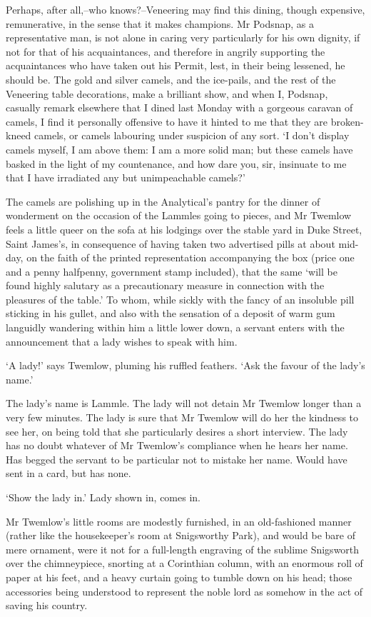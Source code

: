 Perhaps, after all,--who knows?--Veneering may find this dining, though
expensive, remunerative, in the sense that it makes champions.
Mr Podsnap, as a representative man, is not alone in caring very
particularly for his own dignity, if not for that of his acquaintances,
and therefore in angrily supporting the acquaintances who have taken out
his Permit, lest, in their being lessened, he should be. The gold and
silver camels, and the ice-pails, and the rest of the Veneering table
decorations, make a brilliant show, and when I, Podsnap, casually remark
elsewhere that I dined last Monday with a gorgeous caravan of camels,
I find it personally offensive to have it hinted to me that they are
broken-kneed camels, or camels labouring under suspicion of any sort. ‘I
don’t display camels myself, I am above them: I am a more solid man; but
these camels have basked in the light of my countenance, and how dare
you, sir, insinuate to me that I have irradiated any but unimpeachable
camels?’

The camels are polishing up in the Analytical’s pantry for the dinner
of wonderment on the occasion of the Lammles going to pieces, and Mr
Twemlow feels a little queer on the sofa at his lodgings over the stable
yard in Duke Street, Saint James’s, in consequence of having taken
two advertised pills at about mid-day, on the faith of the printed
representation accompanying the box (price one and a penny halfpenny,
government stamp included), that the same ‘will be found highly salutary
as a precautionary measure in connection with the pleasures of the
table.’ To whom, while sickly with the fancy of an insoluble pill
sticking in his gullet, and also with the sensation of a deposit of warm
gum languidly wandering within him a little lower down, a servant enters
with the announcement that a lady wishes to speak with him.

‘A lady!’ says Twemlow, pluming his ruffled feathers. ‘Ask the favour of
the lady’s name.’

The lady’s name is Lammle. The lady will not detain Mr Twemlow longer
than a very few minutes. The lady is sure that Mr Twemlow will do her
the kindness to see her, on being told that she particularly desires
a short interview. The lady has no doubt whatever of Mr Twemlow’s
compliance when he hears her name. Has begged the servant to be
particular not to mistake her name. Would have sent in a card, but has
none.

‘Show the lady in.’ Lady shown in, comes in.

Mr Twemlow’s little rooms are modestly furnished, in an old-fashioned
manner (rather like the housekeeper’s room at Snigsworthy Park), and
would be bare of mere ornament, were it not for a full-length engraving
of the sublime Snigsworth over the chimneypiece, snorting at a
Corinthian column, with an enormous roll of paper at his feet, and a
heavy curtain going to tumble down on his head; those accessories being
understood to represent the noble lord as somehow in the act of saving
his country.

